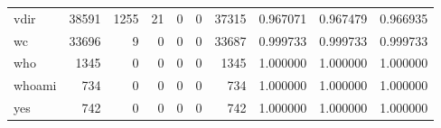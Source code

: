 \begin{tabular}{lrrrrrrrrr}
vdir      &                                              38591 &                                               1255 &                                                 21 &                                                  0 &                                                  0 &                                              37315 &                                           0.967071 &                               0.967479 &                             0.966935 \\
wc        &                                              33696 &                                                  9 &                                                  0 &                                                  0 &                                                  0 &                                              33687 &                                           0.999733 &                               0.999733 &                             0.999733 \\
who       &                                               1345 &                                                  0 &                                                  0 &                                                  0 &                                                  0 &                                               1345 &                                           1.000000 &                               1.000000 &                             1.000000 \\
whoami    &                                                734 &                                                  0 &                                                  0 &                                                  0 &                                                  0 &                                                734 &                                           1.000000 &                               1.000000 &                             1.000000 \\
yes       &                                                742 &                                                  0 &                                                  0 &                                                  0 &                                                  0 &                                                742 &                                           1.000000 &                               1.000000 &                             1.000000 \\
\bottomrule
\end{tabular}
